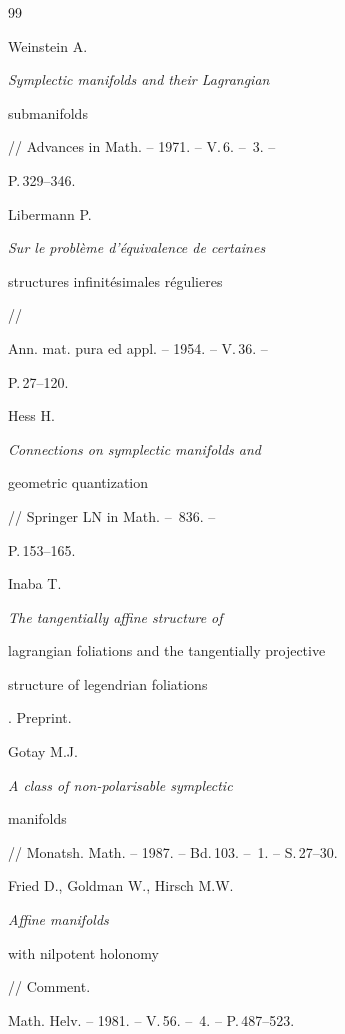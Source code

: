 \begin{thebibliography}{99}







Weinstein A. {\em Symplectic manifolds and their Lagrangian


submanifolds} // Advances in Math. -- 1971. -- V.\,6. -- \No\,3. --


P.\,329--346.







Libermann P. {\em Sur le probl\`eme d'\'equivalence de certaines


structures infinit\'esimales r\'egulieres} //


Ann. mat. pura ed appl. -- 1954. -- V.\,36. --


P.\,27--120.







Hess H. {\em Connections on symplectic manifolds and


geometric quantization} // Springer LN in Math. -- \No\,836. --


P.\,153--165.







Inaba T. {\em The tangentially affine structure of


lagrangian foliations and the tangentially projective


structure of legendrian foliations}. Preprint.







Gotay M.J. {\em A class of non-polarisable symplectic


manifolds} // Monatsh. Math. -- 1987. -- Bd.\,103. -- \No\,1. -- S.\,27--30.







Fried D., Goldman W., Hirsch M.W. {\em Affine manifolds


with nilpotent holonomy} // Comment.


Math. Helv. -- 1981. -- V.\,56. -- \No\,4. -- P.\,487--523.






\end{thebibliography}
